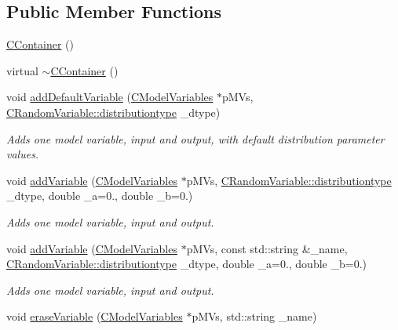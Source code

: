 \subsection*{Public Member Functions}
\begin{DoxyCompactItemize}
\item 
\hyperlink{class_go_s_u_m_1_1_c_container_a468b52f3fd0333d3b4b484520c0cac02}{C\-Container} ()
\item 
virtual \hyperlink{class_go_s_u_m_1_1_c_container_a64b52b2eb80232456bd8de9070d0523c}{$\sim$\-C\-Container} ()
\item 
void \hyperlink{class_go_s_u_m_1_1_c_container_ab6667c4814c0366f485fc3a2ff4ff337}{add\-Default\-Variable} (\hyperlink{class_go_s_u_m_1_1_c_model_variables}{C\-Model\-Variables} $\ast$p\-M\-Vs, \hyperlink{class_c_random_variable_a80d2a87c43847274138b51f7d713d7f1}{C\-Random\-Variable\-::distributiontype} \-\_\-dtype)
\begin{DoxyCompactList}\small\item\em Adds one model variable, input and output, with default distribution parameter values. \end{DoxyCompactList}\item 
void \hyperlink{class_go_s_u_m_1_1_c_container_afc7d8bd3667f7d93e03a38342ba2ea6f}{add\-Variable} (\hyperlink{class_go_s_u_m_1_1_c_model_variables}{C\-Model\-Variables} $\ast$p\-M\-Vs, \hyperlink{class_c_random_variable_a80d2a87c43847274138b51f7d713d7f1}{C\-Random\-Variable\-::distributiontype} \-\_\-dtype, double \-\_\-a=0., double \-\_\-b=0.)
\begin{DoxyCompactList}\small\item\em Adds one model variable, input and output. \end{DoxyCompactList}\item 
void \hyperlink{class_go_s_u_m_1_1_c_container_a431adbe221d0de0361b41ff35d26893f}{add\-Variable} (\hyperlink{class_go_s_u_m_1_1_c_model_variables}{C\-Model\-Variables} $\ast$p\-M\-Vs, const std\-::string \&\-\_\-name, \hyperlink{class_c_random_variable_a80d2a87c43847274138b51f7d713d7f1}{C\-Random\-Variable\-::distributiontype} \-\_\-dtype, double \-\_\-a=0., double \-\_\-b=0.)
\begin{DoxyCompactList}\small\item\em Adds one model variable, input and output. \end{DoxyCompactList}\item 
void \hyperlink{class_go_s_u_m_1_1_c_container_a9058b0abf5548874d0adb58178077f6a}{erase\-Variable} (\hyperlink{class_go_s_u_m_1_1_c_model_variables}{C\-Model\-Variables} $\ast$p\-M\-Vs, std\-::string \-\_\-name)

\end{DoxyCompactItemize}
